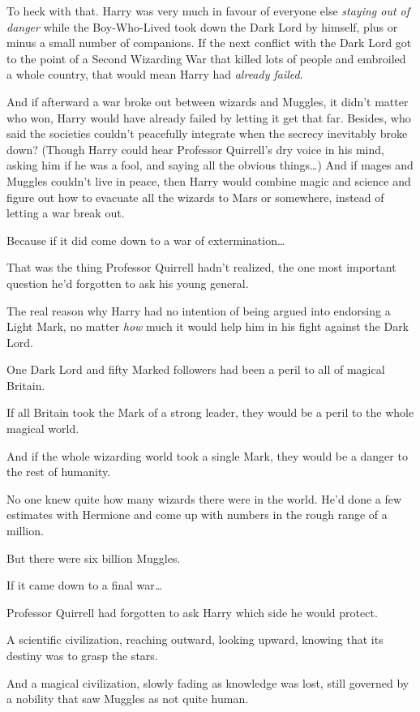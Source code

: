 To heck with that. Harry was very much in favour of everyone else \emph{staying out of danger} while the Boy-Who-Lived took down the Dark Lord by himself, plus or minus a small number of companions. If the next conflict with the Dark Lord got to the point of a Second Wizarding War that killed lots of people and embroiled a whole country, that would mean Harry had \emph{already failed}.

And if afterward a war broke out between wizards and Muggles, it didn’t matter who won, Harry would have already failed by letting it get that far. Besides, who said the societies couldn’t peacefully integrate when the secrecy inevitably broke down? (Though Harry could hear Professor Quirrell’s dry voice in his mind, asking him if he was a fool, and saying all the obvious things…) And if mages and Muggles couldn’t live in peace, then Harry would combine magic and science and figure out how to evacuate all the wizards to Mars or somewhere, instead of letting a war break out.

Because if it did come down to a war of extermination…

That was the thing Professor Quirrell hadn’t realized, the one most important question he’d forgotten to ask his young general.

The real reason why Harry had no intention of being argued into endorsing a Light Mark, no matter \emph{how} much it would help him in his fight against the Dark Lord.

One Dark Lord and fifty Marked followers had been a peril to all of magical Britain.

If all Britain took the Mark of a strong leader, they would be a peril to the whole magical world.

And if the whole wizarding world took a single Mark, they would be a danger to the rest of humanity.

No one knew quite how many wizards there were in the world. He’d done a few estimates with Hermione and come up with numbers in the rough range of a million.

But there were six billion Muggles.

If it came down to a final war…

Professor Quirrell had forgotten to ask Harry which side he would protect.

A scientific civilization, reaching outward, looking upward, knowing that its destiny was to grasp the stars.

And a magical civilization, slowly fading as knowledge was lost, still governed by a nobility that saw Muggles as not quite human.

